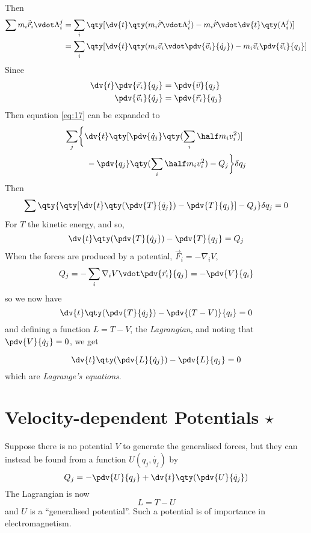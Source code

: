 Then
\begin{align*}
  \sum m_i \ddot{\vec{r}}_i \vdot \Lambda_i^j &= \sum_i \qty[ \dv{t} \qty(m_i \dot{\vec{r}} \vdot \Lambda_i^j ) - m_i \dot{\vec{r}} \vdot \dv{t} \qty( \Lambda^j_i )  ] \\ 
&= \sum_i \qty[ \dv{t} \qty( m_i \vec{v}_i \vdot \pdv{\vec{v}_i}{\dot{q}_j} ) - m_i \vec{v}_i \pdv{\vec{v}_i}{q_j}]
\end{align*}
Since 
\begin{align*}
  \dv{t} \pdv{\vec{r}_i}{q_j} &= \pdv{\vec{v}}{q_j} \\
\pdv{\vec{v}_i}{\dot{{q}}_j} &= \pdv{\vec{r}_i}{q_j}
\end{align*}
Then equation \eqref{eq:17} can be expanded to
\begin{align*} 
  \sum_j & \bigg\{
    \dv{t} \qty[ 
      \pdv{\dot{q}_j} \qty( \sum_i \half m_i v_i^2) 
    ]
    \\ & \quad- \pdv{q_j} \qty( \sum_i \half m_i v_i^2 )
    - Q_j
  \bigg\} \delta q_j
\end{align*}
Then
\begin{equation}
  \label{eq:18}
  \sum \qty{ \qty[
    \dv{t} \qty( \pdv{T}{\dot{q}_j} ) - \pdv{T}{q_j}
  ] - Q_j } \delta q_j = 0
\end{equation}
For $T$ the kinetic energy, and so,
\begin{equation}
  \label{eq:19}
  \dv{t} \qty( \pdv{T}{\dot{q}_j} ) - \pdv{T}{q_j} = Q_j 
\end{equation}
When the forces are produced by a potential, $\vec{F}_i = - \nabla_i
V$,
\[ Q_j = - \sum_i \nabla_i V \vdot \pdv{\vec{r}_i}{q_j} = - \pdv{V}{q_i}\]
so we now have
\begin{equation}
  \label{eq:20}
  \dv{t} \qty( \pdv{T}{\dot{q}_j} ) - \pdv{(T-V)}{q_i} = 0
\end{equation}
and defining a function $L = T - V$, the \emph{Lagrangian}, and noting
that $\pdv{V}{\dot{q}_j} = 0$, we get

\begin{equation}
  \label{eq:21}
  \dv{t} \qty( \pdv{L}{\dot{q}_j} ) - \pdv{L}{q_j} = 0
\end{equation}
which are \emph{Lagrange's equations}.

\section{Velocity-dependent Potentials $\star$}
\label{sec:veloc-depend-potent}

Suppose there is no potential $V$ to generate the generalised forces,
but they can instead be found from a function $U(q_j, \dot{q_j})$ by
\begin{equation}
  \label{eq:22}
  Q_j = - \pdv{U}{q_j} + \dv{t}\qty( \pdv{U}{\dot{q}_j} )
\end{equation}
The Lagrangian is now
\[ L = T-U \] and $U$ is a ``generalised potential''. Such a potential
is of importance in electromagnetism.

